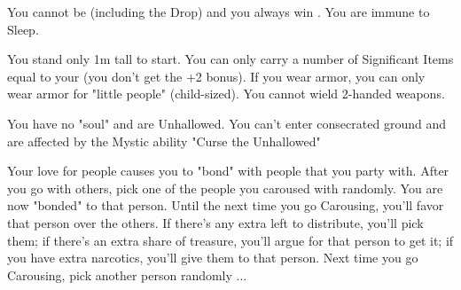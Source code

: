   
    You cannot be  (including the Drop) and you always win .  You are immune to Sleep.




  You stand only 1m tall to start.  You can only carry a number of Significant Items equal to your \MAX \VIG (you don't get the +2 bonus). If you wear armor, you can only wear armor for "little people" (child-sized).  You cannot wield 2-handed weapons.

    
    You have no "soul" and are Unhallowed. You can't enter consecrated ground and are affected by the Mystic ability "Curse the Unhallowed"


    \cbreak


    Your love for people causes you to "bond" with people that you party with.  After you go  with others, pick one of the people you caroused with randomly. You are now "bonded" to that person.  Until the next time you go Carousing, you'll favor that person over the others. If there's any extra  left to distribute, you'll pick them; if there's an extra share of treasure, you'll argue for that person to get it; if you have extra narcotics, you'll give them to that person.  Next time you go Carousing, pick another person randomly ...



 


